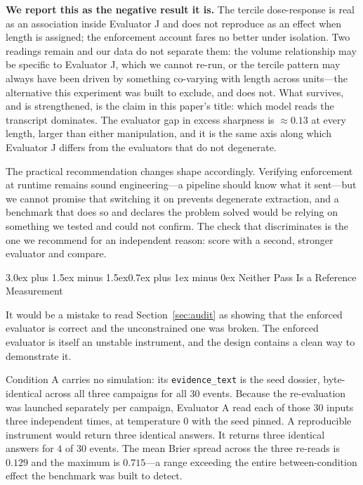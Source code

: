 \documentclass[10pt,conference]{IEEEtran}
\makeatletter
\renewcommand\section{\@startsection{section}{1}{\z@}%
  {3.0ex plus 1.5ex minus 1.5ex}{0.7ex plus 1ex minus 0ex}%
  {\normalfont\normalsize\centering\bfseries}}
\makeatother
\begin{document}
\textbf{We report this as the negative result it is.} The tercile dose-response is real as an association inside Evaluator J and does not reproduce as an effect when length is assigned; the enforcement account fares no better under isolation. Two readings remain and our data do not separate them: the volume relationship may be specific to Evaluator J, which we cannot re-run, or the tercile pattern may always have been driven by something co-varying with length across units---the alternative this experiment was built to exclude, and does not. What survives, and is strengthened, is the claim in this paper's title: which model reads the transcript dominates. The evaluator gap in excess sharpness is $\approx\!0.13$ at every length, larger than either manipulation, and it is the same axis along which Evaluator J differs from the evaluators that do not degenerate.

The practical recommendation changes shape accordingly. Verifying enforcement at runtime remains sound engineering---a pipeline should know what it sent---but we cannot promise that switching it on prevents degenerate extraction, and a benchmark that does so and declares the problem solved would be relying on something we tested and could not confirm. The check that discriminates is the one we recommend for an independent reason: score with a second, stronger evaluator and compare.

\section{Neither Pass Is a Reference Measurement}
\label{sec:noise}

It would be a mistake to read Section~\ref{sec:audit} as showing that the enforced evaluator is correct and the unconstrained one was broken. The enforced evaluator is itself an unstable instrument, and the design contains a clean way to demonstrate it.

Condition A carries no simulation: its \texttt{evidence\_text} is the seed dossier, byte-identical across all three campaigns for all $30$ events. Because the re-evaluation was launched separately per campaign, Evaluator A read each of those $30$ inputs three independent times, at temperature $0$ with the seed pinned. A reproducible instrument would return three identical answers. It returns three identical answers for $4$ of $30$ events. The mean Brier spread across the three re-reads is $0.129$ and the maximum is $0.715$---a range exceeding the entire between-condition effect the benchmark was built to detect.
\end{document}
